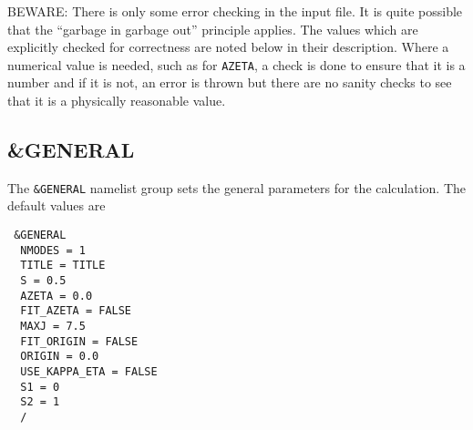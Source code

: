 \documentclass{article}
\begin{document}
BEWARE: There is only some error checking in the input file. It is
quite possible that the ``garbage in garbage out'' principle
applies. The values which are explicitly checked for correctness are noted below in their description. Where a numerical value is needed, such as for {\tt AZETA}, a check is done to ensure that it is a number and if it is not, an error is thrown but there are no sanity checks to see that it is a physically reasonable value.
\subsection{\&GENERAL}

The {\tt \&GENERAL} namelist group sets the general parameters for the
calculation. The default values are

\begin{verbatim}
 &GENERAL 
  NMODES = 1
  TITLE = TITLE
  S = 0.5
  AZETA = 0.0
  FIT_AZETA = FALSE
  MAXJ = 7.5
  FIT_ORIGIN = FALSE
  ORIGIN = 0.0
  USE_KAPPA_ETA = FALSE
  S1 = 0
  S2 = 1
  /
\end{verbatim}
\end{document}
